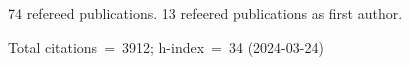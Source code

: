 74 refereed publications. 13 refeered publications as first author.

Total citations~=~3912; h-index~=~34 (2024-03-24)